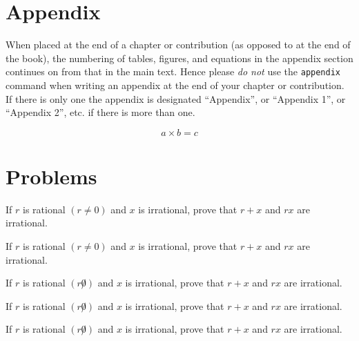\section*{Appendix}
%
When placed at the end of a chapter or contribution (as opposed to at the end of the book), the numbering of tables, figures, and equations in the appendix section continues on from that in the main text. Hence please \textit{do not} use the \verb|appendix| command when writing an appendix at the end of your chapter or contribution. If there is only one the appendix is designated ``Appendix'', or ``Appendix 1'', or ``Appendix 2'', etc. if there is more than one.

\begin{equation}
a \times b = c
\end{equation}
\section*{Problems}
%
\begin{prob}
\label{prob1}
If $r$ is rational $(r \neq 0)$ and $x$ is irrational, prove that $r+x$ and $rx$ are irrational.
\end{prob}

\begin{prob}
\label{prob2}
If $r$ is rational $(r\neq 0)$ and $x$ is irrational, prove that $r+x$ and $rx$ are irrational.
\end{prob}

\begin{prob}
\label{prob3}
If $r$ is rational $(r\not0)$ and $x$ is irrational, prove that $r+x$ and $rx$ are irrational.
\end{prob}

\begin{prob}
\label{prob4}
If $r$ is rational $(r\not0)$ and $x$ is irrational, prove that $r+x$ and $rx$ are irrational.
\end{prob}

\begin{prob}
\label{prob5}
If $r$ is rational $(r\not0)$ and $x$ is irrational, prove that $r+x$ and $rx$ are irrational.
\end{prob}



